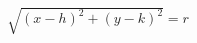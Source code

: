 \documentclass[preview]{standalone}
\begin{document}
\begin{align*}
\sqrt{(x- h )^2 + (y- k )^2} =  r
\end{align*}
\end{document}
